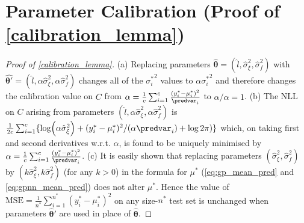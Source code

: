\section{Parameter Calibration (Proof of \autoref{calibration_lemma})}
\label{calibration_phase_proof}


\begin{proof}[Proof of \autoref{calibration_lemma}]
  (a) Replacing parameters $\hat{\bm{\theta}} = (\hat{l},\hat{\sigma}_\xi^2,\hat{\sigma}_f^2)$ with $\hat{\bm{\theta}'} = (\hat{l},\alpha \hat{\sigma}_\xi^2,\alpha \hat{\sigma}_f^2)$ changes all of the ${\sigma_i^*}^2$ values to $\alpha {\sigma_i^*}^2$ and therefore changes the calibration value on $C$ from $\alpha = \frac{1}{c}\sum_{i=1}^c \frac{(y_i^* - \mu_i^*)^2}{\predvar_i}$  to $\alpha/\alpha = 1$. (b) The NLL on $C$ arising from parameters $(\hat{l},\alpha \hat{\sigma}_\xi^2,\alpha \hat{\sigma}_f^2)$ is $\frac{1}{2c} \sum_{i=1}^c \{ \log(\alpha \hat{\sigma}_\xi^2) + (y_i^*-\mu_i^*)^2/(\alpha \predvar_i) + \log2\pi)\}$ which, on taking first and second derivatives w.r.t. $\alpha$, is found to be uniquely minimised by $\alpha = \frac{1}{c}\sum_{i=1}^c \frac{(y_i^* - \mu_i^*)^2}{\predvar_i}$. (c) It is easily shown that replacing parameters $(\hat{\sigma}_\xi^2,\hat{\sigma}_f^2)$ by $(k\hat{\sigma}_\xi^2,k \hat{\sigma}_f^2)$ (for any $k > 0$) in the formula for $\mu^*$ (\autoref{eq:gp_mean_pred} and \autoref{eq:gpnn_mean_pred}) does not alter $\mu^*$. Hence the value of $\mbox{MSE} = \frac{1}{n^*} \sum_{i=1}^{n^*} (y^*_i - {\mu_i^*})^2$ on any size-$n^*$ test set is unchanged when parameters $\hat{\bm{\theta}}'$  are used in place of $\hat{\bm{\theta}}$.
\end{proof}
